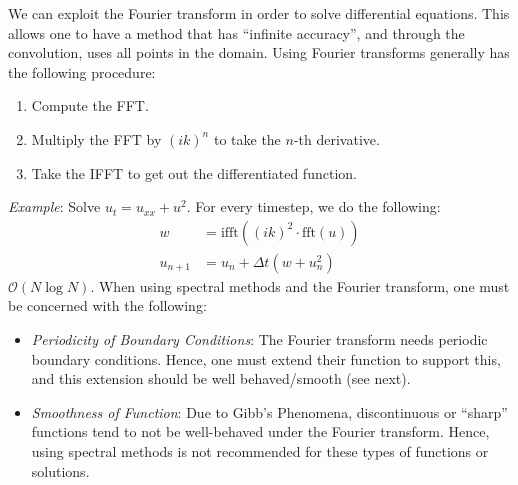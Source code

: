 \documentclass{article}
\begin{document}
\pagebreak

We can exploit the Fourier transform in order to solve differential equations. This allows
one to have a method that has ``infinite accuracy'', and through the convolution, uses
all points in the domain. Using Fourier transforms generally has the following procedure:
\begin{enumerate}
\item Compute the FFT.
\item Multiply the FFT by $(ik)^n$ to take the $n$-th derivative.
\item Take the IFFT to get out the differentiated function.
\end{enumerate}
\textit{Example}: Solve $u_t = u_{xx} + u^2$. For every timestep, we do the following:
\begin{align*}
  w &= \text{ifft}\left( (ik)^2 \cdot \text{fft}(u) \right)\\
  u_{n + 1} &= u_n + \Delta t (w + u_n^2)
\end{align*}
 $\mathcal{O}(N \log N)$.
\gap
{} When using spectral methods and the Fourier transform, one must
be concerned with the following:
\begin{itemize}
\item \textit{Periodicity of Boundary Conditions}: The Fourier transform needs periodic
  boundary conditions. Hence, one must extend their function to support this, and
  this extension should be well behaved/smooth (see next).
\item \textit{Smoothness of Function}: Due to Gibb's Phenomena, discontinuous or ``sharp''
  functions tend to not be well-behaved under the Fourier transform. Hence, using
  spectral methods is not recommended for these types of functions or solutions.
\end{itemize}

\end{document}
